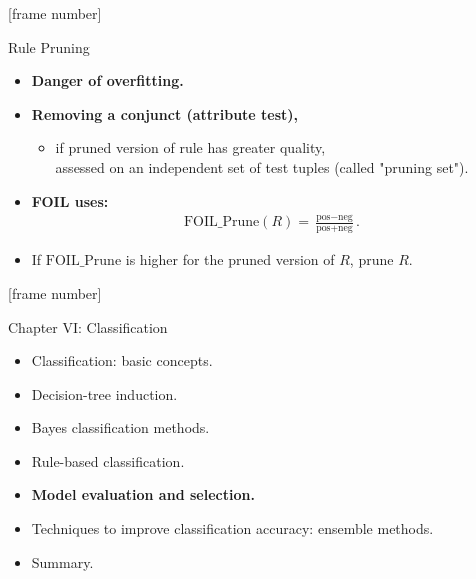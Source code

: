 \documentclass[aspectratio=169,t,table]{beamer}
\begin{document}
  {
    [frame number]
    \begin{frame}{Rule Pruning}
      \begin{itemize}
        \item \textbf{Danger of {\color{airforceblue}overfitting}.}
        \item \textbf{Removing a conjunct (attribute test),}
        \begin{itemize}
          \item if pruned version of rule has greater quality,\\
                assessed on an independent set of test tuples (called "pruning set").
        \end{itemize}
        \item \textbf{FOIL uses:}
              \begin{align}
                \text{FOIL\_Prune}(R) = \frac{\text{pos}-\text{neg}}{\text{pos}+\text{neg}}.
              \end{align}
        \item If $\text{FOIL\_Prune}$ is higher for the pruned version of $R$, prune $R$.
      \end{itemize}
    \end{frame}
  }

  {
    [frame number]
    \begin{frame}{Chapter VI: Classification}
        \begin{itemize}
            \item Classification: basic concepts.
            \item Decision-tree induction.
            \item Bayes classification methods.
            \item Rule-based classification.
            \item \textbf{Model evaluation and selection.}
            \item Techniques to improve classification accuracy: ensemble methods.
            \item Summary.
        \end{itemize}
    \end{frame}
  }
\end{document}
